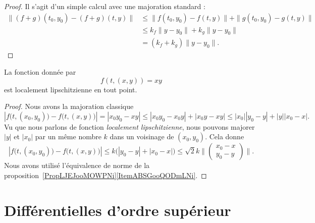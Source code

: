 \begin{proof}
	Il s'agit d'un simple calcul avec une majoration standard :
	\begin{subequations}
		\begin{align}
			\| (f+g)(t_0,y_0)-(f+g)(t,y) \| & \leq \|  f(t_0,y_0)-f(t,y)  \|+\| g(t_0,y_0)-g(t,y) \| \\
			                                & \leq k_f\| y-y_0 \|+k_g\| y-y_0 \|                     \\
			                                & =(k_f+k_g)\| y-y_0 \|.
		\end{align}
	\end{subequations}
\end{proof}

\begin{lemma}   \label{LemCFZUooVqZmpc}
	La fonction donnée par
	\begin{equation}
		f(t, (x,y) )=xy
	\end{equation}
	est localement lipschitzienne en tout point.
\end{lemma}

\begin{proof}
	Nous avons la majoration classique
	\begin{equation}
		| f\big(t,(x_0,y_0)\big)-f\big( t,(x,y) \big) |=| x_0y_0-xy |\leq| x_0y_0-x_0y |+| x_0y-xy |\leq | x_0 || y_0-y |+| y || x_0-x |.
	\end{equation}
	Vu que nous parlons de fonction \emph{localement lipschitzienne}, nous pouvons majorer \( | y |\) et \( | x_0 |\) par un même nombre \( k\) dans un voisinage de \( (x_0,y_0)\). Cela donne
	\begin{equation}
		| f\big(t,(x_0,y_0)\big)-f\big( t,(x,y) \big) |\leq k\big( | y_0-y |+| x_0-x | \big)\leq \sqrt{2}k\| \begin{pmatrix}
			x_0-x \\
			y_0-y
		\end{pmatrix}\|.
	\end{equation}
	Nous avons utilisé l'équivalence de norme de la proposition~\ref{PropLJEJooMOWPNi}\ref{ItemABSGooQODmLNi}.
\end{proof}

\section{Différentielles d'ordre supérieur}		\label{SecDiffOrdSup}


